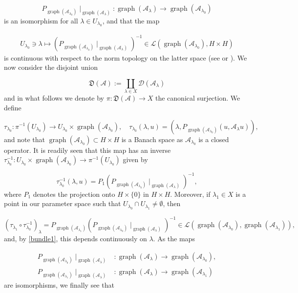 \documentclass[a4paper,10pt]{article}
\DeclareMathOperator{\gra}{graph}
\begin{document}
\[P_{\gra(\mathcal{A}_{\lambda_0})}\mid_{\gra(\mathcal{A}_\lambda)}:\gra(\mathcal{A}_\lambda)\rightarrow\gra(\mathcal{A}_{\lambda_0})\]
is an isomorphism for all $\lambda\in U_{\lambda_0}$, and that the map

\begin{align}\label{bundle1}
U_{\lambda_0}\ni \lambda\mapsto (P_{\gra(\mathcal{A}_{\lambda_0})}\mid_{\gra(\mathcal{A}_\lambda)})^{-1}\in\mathcal{L}(\gra(\mathcal{A}_{\lambda_0}),H\times H)
\end{align}
is continuous with respect to the norm topology on the latter space (see \cite{AbbondandoloMajerGrass} or \cite[\S 6.1]{thesis}). We now consider the disjoint union

\[\mathfrak{D}(\mathcal{A}):=\coprod_{\lambda\in X}\mathcal{D}(\mathcal{A}_\lambda)\]
and in what follows we denote by $\pi:\mathfrak{D}(\mathcal{A})\rightarrow X$ the canonical surjection. We define

\[\tau_{\lambda_0}:\pi^{-1}(U_{\lambda_0})\rightarrow U_{\lambda_0}\times\gra(\mathcal{A}_{\lambda_0}),\quad \tau_{\lambda_0}(\lambda,u)=(\lambda,P_{\gra(\mathcal{A}_{\lambda_0})}(u,\mathcal{A}_{\lambda}u)),\]
and note that $\gra(\mathcal{A}_{\lambda_0})\subset H\times H$ is a Banach space as $\mathcal{A}_{\lambda_0}$ is a closed operator. It is readily seen that this map has an inverse $\tau^{-1}_{\lambda_0}:U_{\lambda_0}\times\gra(\mathcal{A}_{\lambda_0})\rightarrow\pi^{-1}(U_{\lambda_0})$ given by

\[\tau^{-1}_{\lambda_0}(\lambda,u)=P_1(P_{\gra(\mathcal{A}_{\lambda_0})}\mid_{\gra(\mathcal{A}_\lambda)})^{-1},\]
where $P_1$ denotes the projection onto $H\times\{0\}$ in $H\times H$. Moreover, if $\lambda_1\in X$ is a point in our parameter space such that $U_{\lambda_0}\cap U_{\lambda_1}\neq\emptyset$, then

\[(\tau_{\lambda_1}\circ\tau^{-1}_{\lambda_0})_\lambda=P_{\gra(\mathcal{A}_{\lambda_1})}(P_{\gra(\mathcal{A}_{\lambda_0})}\mid_{\gra(\mathcal{A}_\lambda)})^{-1}\in \mathcal{L}(\gra(\mathcal{A}_{\lambda_0}),\gra(\mathcal{A}_{\lambda_1})),\] 
and, by \eqref{bundle1}, this depends continuously on $\lambda$. As the maps

\begin{align*}
P_{\gra(\mathcal{A}_{\lambda_0})}\mid_{\gra(\mathcal{A}_\lambda)}&:\gra(\mathcal{A}_\lambda)\rightarrow\gra(\mathcal{A}_{\lambda_0}),\\
P_{\gra(\mathcal{A}_{\lambda_1})}\mid_{\gra(\mathcal{A}_\lambda)}&:\gra(\mathcal{A}_\lambda)\rightarrow\gra(\mathcal{A}_{\lambda_1})
\end{align*} 
are isomorphisms, we finally see that 
\end{document}
